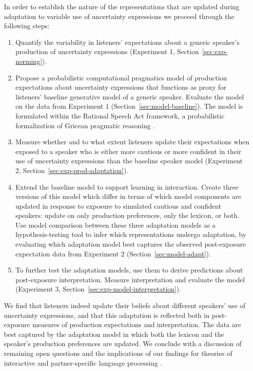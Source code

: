 \documentclass[man, floatsintext]{apa6}
\newcommand{\sectionref}[1]{Section~\ref{#1}}
\begin{document}
In order to establish the nature of the representations that are updated during adaptation to variable use of uncertainty expressions we proceed through the following steps:
\begin{enumerate}
	\item Quantify the variability in listeners' expectations about a generic speaker's production of uncertainty expressions (Experiment 1, \sectionref{sec:exp-norming}).
	\item Propose a probabilistic computational pragmatics model of production expectations about uncertainty expressions that functions as proxy for listeners' baseline generative model of a generic speaker. Evaluate the model on the data from Experiment 1 (\sectionref{sec:model-baseline}). The model is formulated within the Rational Speech Act framework, a probabilistic formalization of Gricean pragmatic reasoning   \parencite{Frank2012,Goodman2016,Franke2016}.
	\item Measure whether and to what extent listeners update their expectations when exposed to a speaker who is either more cautious or more confident in their use of uncertainty expressions than the baseline speaker model (Experiment 2, \sectionref{sec:exp-prod-adaptation}).
	\item Extend the baseline model to support learning in interaction. Create three versions of this model which differ in terms of which model components are updated in response to exposure to simulated cautious and confident speakers: update on only production preferences, only the lexicon, or both. Use model comparison between these three adaptation models as a hypothesis-testing tool to infer which representations undergo adaptation, by evaluating which adaptation model best captures the observed post-exposure expectation data from Experiment 2 (\sectionref{sec:model-adapt}).
	\item To further test the adaptation models, use them to derive predictions about post-exposure interpretation. Measure interpretation and evaluate the model (Experiment 3, \sectionref{sec:exp-model-interpretation}).
\end{enumerate}

We find that listeners indeed update their beliefs about different  speakers' use of uncertainty expressions, and that this adaptation is reflected both in post-exposure measures of production expectations and interpretation. The data are best captured by the adaptation model in which both the lexicon and the speaker's production preferences are updated. We conclude with a discussion of remaining open questions and the implications of our findings for theories
of interactive  \parencite[e.g.,][]{Pickering2004,Pickering2013} and partner-specific language processing \parencite[e.g.,][]{Metzing2003,Horton2005,Horton2016}.
\end{document}
